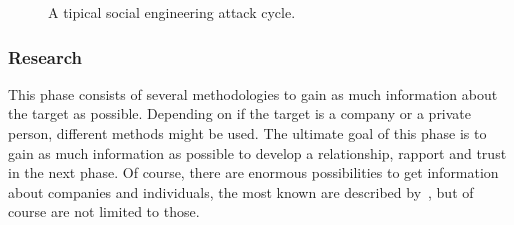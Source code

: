 \begin{figure}
  \begin{center}

    \caption{A tipical social engineering attack cycle.}
  \end{center}
\end{figure}

\subsubsection{Research}

This phase consists of several methodologies to gain as much information about
the target as possible. Depending on if the target is a company or a
private person, different methods might be used. The ultimate goal of this
phase is to gain as much information as possible to develop a relationship,
rapport and trust in the next phase. Of course, there are enormous
possibilities to get information about companies and individuals, the most
known are described by~\cite{jones2004,mitnick2003,thornburgh2004}, but of
course are not limited to those.


